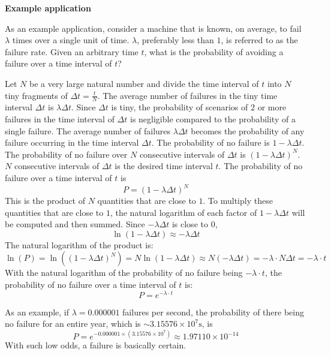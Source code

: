\documentclass{article}
\begin{document}
\vspace{5mm}

\textbf{Example application}

As an example application, consider a machine that is known, on average, to fail \(\lambda\) times over a single unit of time. \(\lambda\), preferably less than \(1\), is referred to as the failure rate. Given an arbitrary time \(t\), what is the probability of avoiding a failure over a time interval of \(t\)? 

Let \(N\) be a very large natural number and divide the time interval of \(t\) into \(N\) tiny fragments of \(\Delta t = \frac{t}{N}\). The average number of failures in the tiny time interval \(\Delta t\) is \(\lambda\Delta t\). Since \(\Delta t\) is tiny, the probability of scenarios of \(2\) or more failures in the time interval of \(\Delta t\) is negligible compared to the probability of a single failure. The average number of failures \(\lambda\Delta t\) becomes the probability of any failure occurring in the time interval \(\Delta t\). The probability of no failure is \(1 - \lambda\Delta t\). The probability of no failure over \(N\) consecutive intervals of \(\Delta t\) is \((1 - \lambda\Delta t)^N\). \(N\) consecutive intervals of \(\Delta t\) is the desired time interval \(t\). The probability of no failure over a time interval of \(t\) is 
\[P = (1 - \lambda\Delta t)^N\]  
This is the product of \(N\) quantities that are close to \(1\). To multiply these quantities that are close to \(1\), the natural logarithm of each factor of \(1 - \lambda\Delta t\) will be computed and then summed. Since \(-\lambda\Delta t\) is close to \(0\),
\[\ln(1 - \lambda\Delta t) \approx -\lambda \Delta t\]
The natural logarithm of the product is:
\[\ln(P) = \ln((1 - \lambda\Delta t)^N) = N\ln(1 - \lambda\Delta t) \approx N(-\lambda \Delta t) = -\lambda \cdot N\Delta t = -\lambda \cdot t\]
With the natural logarithm of the probability of no failure being \(-\lambda \cdot t\), the probability of no failure over a time interval of \(t\) is:
\[P = e^{-\lambda \cdot t}\] 

As an example, if \(\lambda = 0.000001\) failures per second, the probability of there being no failure for an entire year, which is \(\sim 3.15576 \times 10^7\text{s}\), is
\[P = e^{-0.000001 \times (3.15576 \times 10^7)} \approx 1.97110 \times 10^{-14}\]
With such low odds, a failure is basically certain.
\end{document}
